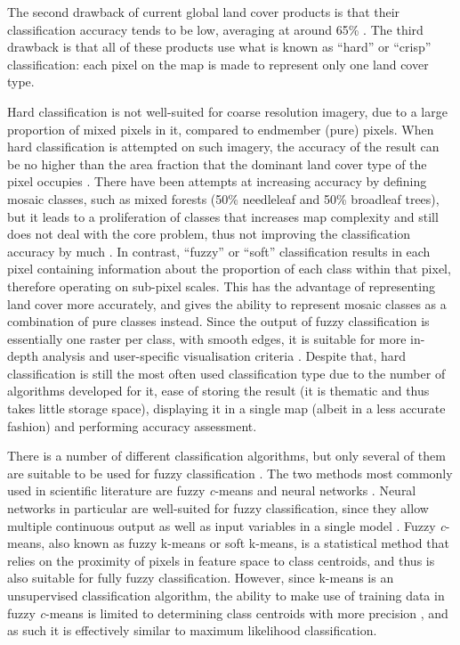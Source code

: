 \documentclass[a4paper,10pt]{book}
\begin{document}
The second drawback of current global land cover products is that their classification accuracy tends to be low, averaging at around 65\% \citep{tsendbazar2016integrating}. The third drawback is that all of these products use what is known as ``hard'' or ``crisp'' classification: each pixel on the map is made to represent only one land cover type.

Hard classification is not well-suited for coarse resolution imagery, due to a large proportion of mixed pixels in it, compared to endmember (pure) pixels. When hard classification is attempted on such imagery, the accuracy of the result can be no higher than the area fraction that the dominant land cover type of the pixel occupies \citep{latifovic2004accuracy}. There have been attempts at increasing accuracy by defining mosaic classes, such as mixed forests (50\% needleleaf and 50\% broadleaf trees), but it leads to a proliferation of classes that increases map complexity and still does not deal with the core problem, thus not improving the classification accuracy by much \citep{tsendbazar2016comparative}. In contrast, ``fuzzy'' or ``soft'' classification results in each pixel containing information about the proportion of each class within that pixel, therefore operating on sub-pixel scales. This has the advantage of representing land cover more accurately, and gives the ability to represent mosaic classes as a combination of pure classes instead. Since the output of fuzzy classification is essentially one raster per class, with smooth edges, it is suitable for more in-depth analysis and user-specific visualisation criteria \citep{tsendbazar2016integrating}. Despite that, hard classification is still the most often used classification type due to the number of algorithms developed for it, ease of storing the result (it is thematic and thus takes little storage space), displaying it in a single map (albeit in a less accurate fashion) and performing accuracy assessment.

There is a number of different classification algorithms, but only several of them are suitable to be used for fuzzy classification \citep{nath2014methods}. The two methods most commonly used in scientific literature are fuzzy \textit{c}-means and neural networks \citep{zhang2001fullyfuzzy}. Neural networks in particular are well-suited for fuzzy classification, since they allow multiple continuous output as well as input variables in a single model \citep{foody1997fuzzynnet}. Fuzzy \textit{c}-means, also known as fuzzy k-means or soft k-means, is a statistical method that relies on the proximity of pixels in feature space to class centroids, and thus is also suitable for fully fuzzy classification. However, since k-means is an unsupervised classification algorithm, the ability to make use of training data in fuzzy \textit{c}-means is limited to determining class centroids with more precision \citep{hengl2004fuzzycmeans}, and as such it is effectively similar to maximum likelihood classification.
\end{document}
